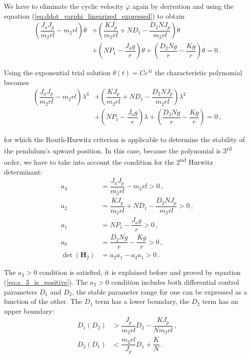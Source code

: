 \noindent
We have to eliminate the cyclic velocity $\dot{\varphi}$ again by derivation and using the equation (\ref{eq:ddot_varphi_linearized_expressed}) to obtain 
\begin{align}
\left(\dfrac{J_a J_p}{m_2 r l}- m_2 r l\right) \dddot \theta 
&+
\left(\dfrac{KJ_p}{m_2 r l} + ND_1 - \dfrac{D_2 N J_p}{m_2 r l}\right) \ddot\theta
\nonumber \\
&+
\left(NP_1 - \dfrac{J_a g}{r}\right) \dot \theta
+
\left(\dfrac{D_2 N g}{r}-\dfrac{Kg}{r}\right) \theta = 0\,. \label{eq:PDD_diffeq}
\end{align}

\noindent
Using the exponential trial solution $\theta(t) = Ce^{\lambda t} $ the characteristic polynomial becomes
\begin{align}
\left(\dfrac{J_a J_p}{m_2 r l}- m_2 r l\right) \lambda^3 
&+
\left(\dfrac{KJ_p}{m_2 r l} + ND_1 - \dfrac{D_2 N J_p}{m_2 r l}\right) \lambda^2
\nonumber \\
&+
\left(NP_1 - \dfrac{J_a g}{r}\right) \lambda
+
\left(\dfrac{D_2 N g}{r}-\dfrac{Kg}{r}\right) = 0\,, \label{eq:PDD_charpoly}
\end{align}

\noindent 
for which the Routh-Hurwitz criterion is applicable to determine the stability of the pendulum's upward position. In this case, because the polynomial is 3\textsuperscript{rd} order, we have to take into account the condition for the 2\textsuperscript{nd} Hurwitz determinant:
\begin{align}
a_3&=\dfrac{J_a J_p}{m_2 r l}- m_2 r l >0\,, 	\label{eq:PDD_analog_a3}	
\\
%
a_2&=\dfrac{KJ_p}{m_2 r l} + ND_1 - \dfrac{D_2 N J_p}{m_2 r l} >0\,,
\\
%
a_1&=NP_1 - \dfrac{J_a g}{r} >0\,, 				\label{eq:motor_DD_condition} \\
a_0&=\dfrac{D_2 N g}{r}-\dfrac{Kg}{r} >0 \,,						\\
\det(\mathbf H_2) &= a_2a_1-a_3a_1 > 0\,.
\end{align}

\noindent
The $a_3>0$ condition is satisfied, it is explained before and proved by equation (\ref{eq:a_3_is_positive}).
The $a_2>0$ condition includes both differential control parameters $D_1$ and $D_2$, the stable parameter range for one can be expressed as a function of the other. The $D_1$ term has a lower boundary, the $D_2$ term has an upper boundary:
\begin{align}
	D_1(D_2) &> \dfrac{J_p}{m_2 r l}D_2  - \dfrac{K J_p}{N m_2 r l}\,,\\
	D_2(D_1) &< \dfrac{m_2 r l}{ J_p} D_1  + \dfrac{K}{N}\,.
\end{align}

